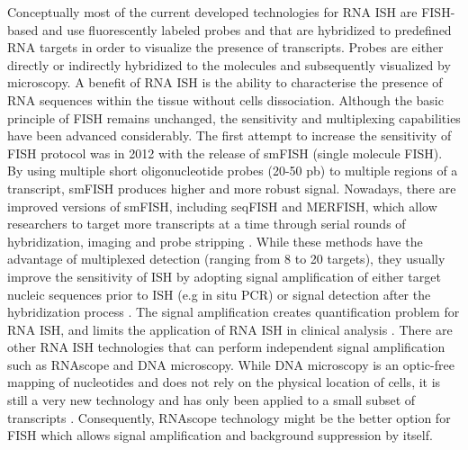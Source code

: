 Conceptually most of the current developed technologies for RNA ISH are FISH-based and use fluorescently labeled probes and that are hybridized to predefined RNA targets in order to visualize the presence of transcripts. Probes are either directly or indirectly hybridized to the molecules and subsequently visualized by microscopy. A benefit of RNA ISH is the ability to characterise the presence of RNA sequences within the tissue without cells dissociation. Although the basic principle of FISH remains unchanged, the sensitivity and multiplexing capabilities have been advanced considerably. The first attempt to increase the sensitivity of FISH protocol was in 2012 with the release of smFISH (single molecule FISH). By using multiple short oligonucleotide probes (20-50 pb) to multiple regions of a transcript, smFISH produces higher and more robust signal. Nowadays, there are improved versions of smFISH, including seqFISH and MERFISH, which allow researchers to target more transcripts at a time through serial rounds of hybridization, imaging and probe stripping \cite{asp2020spatially}. While these methods have the advantage of multiplexed detection (ranging from 8 to 20 targets), they usually improve the sensitivity of ISH by adopting signal amplification of either target nucleic sequences prior to ISH (e.g in situ PCR) or signal detection after the hybridization process \cite{qian2003recent}. The signal amplification creates quantification problem for RNA ISH, and limits the application of RNA ISH in clinical analysis \cite{levsky2003fluorescence,wang2012rnascope}. There are other RNA ISH technologies that can perform independent signal amplification such as RNAscope and DNA microscopy. While DNA microscopy is an optic-free mapping of nucleotides and does not rely on the physical location of cells, it is still a very new technology and has only been applied to a small subset of transcripts \cite{asp2020spatially,weinstein2019dna}. Consequently, RNAscope technology might be the better option for FISH which allows signal amplification and background suppression by itself.

